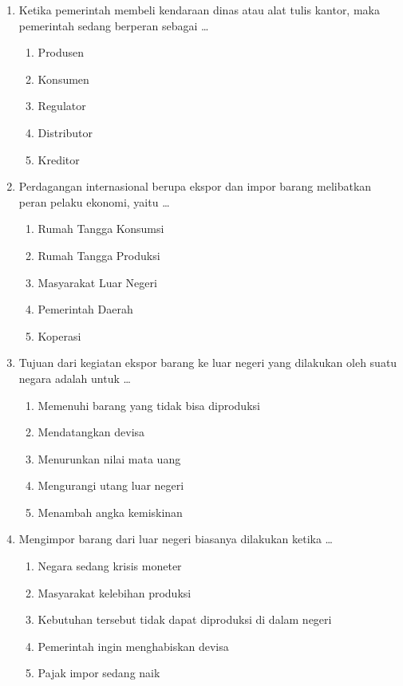 \documentclass[12pt,a4paper]{article}
\begin{document}
\begin{enumerate}[leftmargin=*]
\item Ketika pemerintah membeli kendaraan dinas atau alat tulis kantor, maka pemerintah sedang berperan sebagai \dots
    \begin{enumerate}[label=\alph*.]
        \item Produsen
        \item Konsumen
        \item Regulator
        \item Distributor
        \item Kreditor
    \end{enumerate}

\item Perdagangan internasional berupa ekspor dan impor barang melibatkan peran pelaku ekonomi, yaitu \dots
    \begin{enumerate}[label=\alph*.]
        \item Rumah Tangga Konsumsi
        \item Rumah Tangga Produksi
        \item Masyarakat Luar Negeri
        \item Pemerintah Daerah
        \item Koperasi
    \end{enumerate}

\item Tujuan dari kegiatan ekspor barang ke luar negeri yang dilakukan oleh suatu negara adalah untuk \dots
    \begin{enumerate}[label=\alph*.]
        \item Memenuhi barang yang tidak bisa diproduksi
        \item Mendatangkan devisa
        \item Menurunkan nilai mata uang
        \item Mengurangi utang luar negeri
        \item Menambah angka kemiskinan
    \end{enumerate}

\item Mengimpor barang dari luar negeri biasanya dilakukan ketika \dots
    \begin{enumerate}[label=\alph*.]
        \item Negara sedang krisis moneter
        \item Masyarakat kelebihan produksi
        \item Kebutuhan tersebut tidak dapat diproduksi di dalam negeri
        \item Pemerintah ingin menghabiskan devisa
        \item Pajak impor sedang naik
    \end{enumerate}

\end{enumerate}
\end{document}
